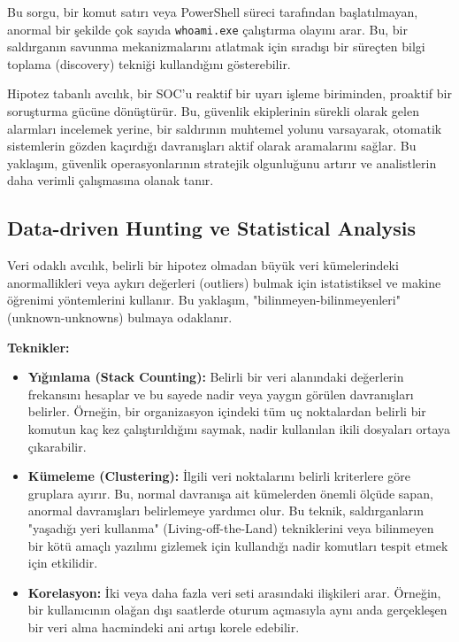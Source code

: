 Bu sorgu, bir komut satırı veya PowerShell süreci tarafından başlatılmayan, anormal bir şekilde çok sayıda \texttt{whoami.exe} çalıştırma olayını arar. Bu, bir saldırganın savunma mekanizmalarını atlatmak için sıradışı bir süreçten bilgi toplama (discovery) tekniği kullandığını gösterebilir.

Hipotez tabanlı avcılık, bir SOC'u reaktif bir uyarı işleme biriminden, proaktif bir soruşturma gücüne dönüştürür. Bu, güvenlik ekiplerinin sürekli olarak gelen alarmları incelemek yerine, bir saldırının muhtemel yolunu varsayarak, otomatik sistemlerin gözden kaçırdığı davranışları aktif olarak aramalarını sağlar. Bu yaklaşım, güvenlik operasyonlarının stratejik olgunluğunu artırır ve analistlerin daha verimli çalışmasına olanak tanır.

\subsection{Data-driven Hunting ve Statistical Analysis}

Veri odaklı avcılık, belirli bir hipotez olmadan büyük veri kümelerindeki anormallikleri veya aykırı değerleri (outliers) bulmak için istatistiksel ve makine öğrenimi yöntemlerini kullanır. Bu yaklaşım, "bilinmeyen-bilinmeyenleri" (unknown-unknowns) bulmaya odaklanır.

\textbf{Teknikler:}

\begin{itemize}
    \item \textbf{Yığınlama (Stack Counting):} Belirli bir veri alanındaki değerlerin frekansını hesaplar ve bu sayede nadir veya yaygın görülen davranışları belirler. Örneğin, bir organizasyon içindeki tüm uç noktalardan belirli bir komutun kaç kez çalıştırıldığını saymak, nadir kullanılan ikili dosyaları ortaya çıkarabilir.
    \item \textbf{Kümeleme (Clustering):} İlgili veri noktalarını belirli kriterlere göre gruplara ayırır. Bu, normal davranışa ait kümelerden önemli ölçüde sapan, anormal davranışları belirlemeye yardımcı olur. Bu teknik, saldırganların "yaşadığı yeri kullanma" (Living-off-the-Land) tekniklerini veya bilinmeyen bir kötü amaçlı yazılımı gizlemek için kullandığı nadir komutları tespit etmek için etkilidir.
    \item \textbf{Korelasyon:} İki veya daha fazla veri seti arasındaki ilişkileri arar. Örneğin, bir kullanıcının olağan dışı saatlerde oturum açmasıyla aynı anda gerçekleşen bir veri alma hacmindeki ani artışı korele edebilir.
\end{itemize}

